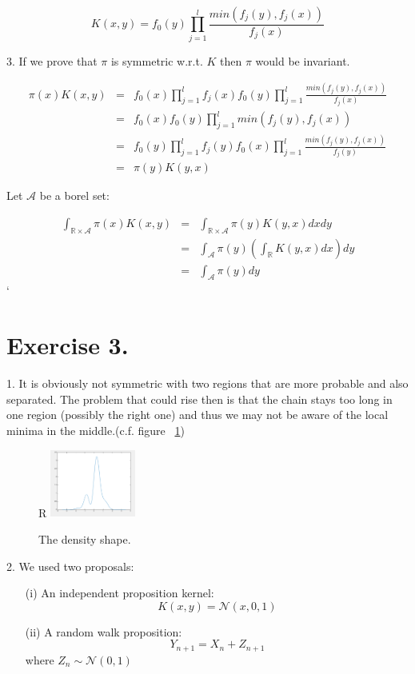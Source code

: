 \documentclass[paper=a4, fontsize=11pt]{scrartcl} %
\numberwithin{equation}{section} %
\numberwithin{figure}{section} %
\numberwithin{table}{section} %
\begin{document}
	\begin{equation}
		K(x,y)=f_0(y) \prod_{j=1}^{l} \frac{min(f_j(y),f_j(x))}{f_j(x)}
	\end{equation}
	
	3. If we prove that $\pi$ is symmetric w.r.t. $K$ then $\pi$ would be invariant.
	
	\begin{eqnarray*}
		\pi(x)K(x,y)&=& f_0(x) \prod_{j=1}^{l} f_j(x) f_0(y) \prod_{j=1}^{l} \frac{min(f_j(y),f_j(x))}{f_j(x)}\\
						&=&  f_0(x) f_0(y) \prod_{j=1}^{l} min(f_j(y),f_j(x))\\
						&=& f_0(y) \prod_{j=1}^{l} f_j(y) f_0(x) \prod_{j=1}^{l} \frac{min(f_j(y),f_j(x))}{f_j(y)}\\
						&=& \pi(y)K(y,x)
	\end{eqnarray*}
	
	Let $\mathscr{A}$ be a borel set:
	
	\begin{eqnarray*}
		\int_{\mathscr{\mathbb{R} \times A}} 	\pi(x)K(x,y) &=& 	\int_{\mathscr{\mathbb{R} \times A}}  \pi(y)K(y,x) dx dy\\
																						&=& \int_{\mathscr{A }} \pi(y)( \int_{\mathscr{\mathbb{R}}} K(y,x) dx) dy\\
																						&=& \int_{\mathscr{A }} \pi(y) dy
	\end{eqnarray*}`
	
		
		\section{Exercise 3.}
	1. It is obviously not symmetric with two regions that are more probable and also separated. The problem that could rise then is that the chain stays too long in one region (possibly the right one) and thus we may not be aware of the local minima in the middle.(c.f. figure ~\ref{fig:density})\\
	
	\begin{figure}{R}
		\centering
		\includegraphics[width=0.25\textwidth]{density}
		\caption{\label{fig:density}The density shape.}
	\end{figure}
	2. We used two proposals:
	\begin{itemize}
		\item[(i)] An independent proposition kernel:
		$$K(x,y)=\mathscr{N}(x,0,1)$$
		\item[(ii)] A random walk proposition:
		$$Y_{n+1}=X_n+Z_{n+1}$$
		where $Z_n \sim \mathscr{N} (0,1)$
	\end{itemize}
	
\end{document}
